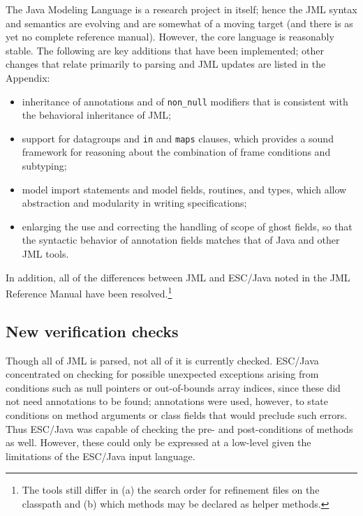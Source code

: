 \documentclass{llncs}
\begin{document}
The Java Modeling Language is a research project in itself; hence the
JML syntax and semantics are evolving and are somewhat of a moving
target (and there is as yet no complete reference manual).  However,
the core language is reasonably stable.  The following are key
additions that have been implemented; other changes that relate
primarily to parsing and JML updates are listed in the Appendix:

\setlength{\partopsep}{0in}\setlength{\parskip}{0in}\setlength{\itemsep}{0in}\setlength{\topsep}{0in}
\begin{itemize}
\setlength{\partopsep}{0in}\setlength{\parskip}{0in}\setlength{\itemsep}{0in}\setlength{\topsep}{0in}
\item inheritance of annotations and of \texttt{non\_null} modifiers
  that is consistent with the behavioral inheritance of JML;
\item support for datagroups and \texttt{in} and \texttt{maps}
  clauses, which provides a sound framework for reasoning about the
  combination of frame conditions and subtyping;
\item model import statements and model fields, routines, and types,
  which allow abstraction and modularity in writing specifications;
\item enlarging the use and correcting the handling of scope of ghost
  fields, so that the syntactic behavior of annotation fields matches
  that of Java and other JML tools.
\end{itemize}
In addition, all of the differences between JML and ESC/Java noted in
the JML Reference Manual have been resolved.\footnote{The tools still differ 
in (a) the search order for refinement files on the classpath and (b) which
methods may be declared as helper methods.}

\subsection{New verification checks}
Though all of JML is parsed, not all of it is currently checked.
ESC/Java concentrated on checking for possible
unexpected exceptions arising from conditions such as null pointers or out-of-bounds 
array indices, since these did not need annotations to be found; annotations
were used, however, to state conditions on method arguments or class fields
that would preclude such errors.  Thus ESC/Java was capable of checking the
pre- and post-conditions of methods as well.  However, these could only be expressed
at a low-level given the limitations of the ESC/Java input language.
\end{document}
